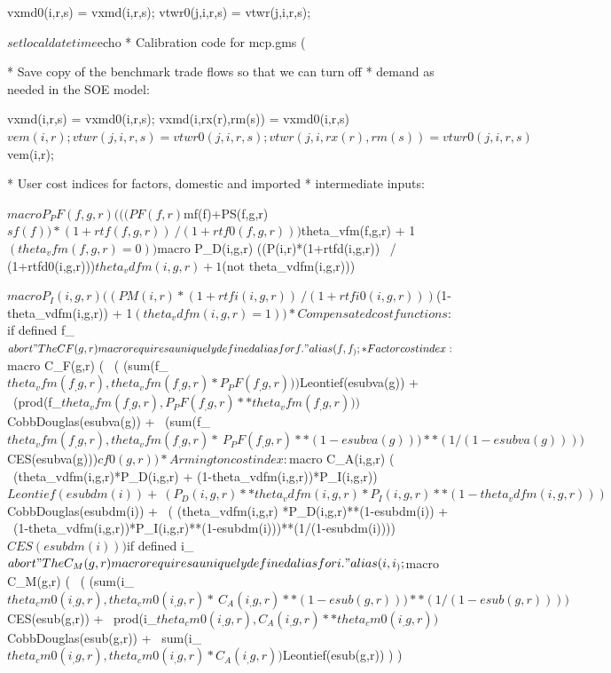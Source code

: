 \begin{GAMSCode*}
vxmd0(i,r,s) = vxmd(i,r,s);
vtwr0(j,i,r,s) = vtwr(j,i,r,s);

$setlocal datetime %
$echo   *       Calibration code for mcp.gms (%

*       Save copy of the benchmark trade flows so that we can turn off
*       demand as needed in the SOE model:

vxmd(i,r,s) = vxmd0(i,r,s);
vxmd(i,rx(r),rm(s)) = vxmd0(i,r,s)$vem(i,r);

vtwr(j,i,r,s) = vtwr0(j,i,r,s);
vtwr(j,i,rx(r),rm(s)) = vtwr0(j,i,r,s)$vem(i,r);

*       User cost indices for factors, domestic and imported
*       intermediate inputs:

$macro P_PF(f,g,r) (((PF(f,r)$mf(f)+PS(f,g,r)$sf(f))*(1+rtf(f,g,r)) \
                / (1+rtf0(f,g,r)))$theta_vfm(f,g,r)  + 1$(theta_vfm(f,g,r)=0))

$macro P_D(i,g,r)  ((P(i,r)*(1+rtfd(i,g,r)) \
                / (1+rtfd0(i,g,r)))$theta_vdfm(i,g,r) + 1$(not theta_vdfm(i,g,r)))

$macro P_I(i,g,r)  ((PM(i,r)*(1+rtfi(i,g,r)) \
                / (1+rtfi0(i,g,r)))$(1-theta_vdfm(i,g,r)) + 1$(theta_vdfm(i,g,r)=1))

*       Compensated cost functions:

$if defined f_ $abort "The CF(g,r) macro requires a uniquely defined alias for f."
alias (f,f_);

*       Factor cost index:

$macro C_F(g,r) ( \
        ( (sum(f_$theta_vfm(f_,g,r),  theta_vfm(f_,g,r)*P_PF(f_,g,r)))$Leontief(esubva(g)) + \
          (prod(f_$theta_vfm(f_,g,r), P_PF(f_,g,r)**theta_vfm(f_,g,r)))$CobbDouglas(esubva(g)) + \
          (sum(f_$theta_vfm(f_,g,r),  theta_vfm(f_,g,r)* \
                P_PF(f_,g,r)**(1-esubva(g)))**(1/(1-esubva(g))))$CES(esubva(g)))$cf0(g,r) )

*       Armington cost index:

$macro C_A(i,g,r) ( \
        (theta_vdfm(i,g,r)*P_D(i,g,r) + (1-theta_vdfm(i,g,r))*P_I(i,g,r))$Leontief(esubdm(i)) + \
        (P_D(i,g,r)**theta_vdfm(i,g,r) * P_I(i,g,r)**(1-theta_vdfm(i,g,r)))$CobbDouglas(esubdm(i)) + \
        ( (theta_vdfm(i,g,r) *P_D(i,g,r)**(1-esubdm(i)) + \
        (1-theta_vdfm(i,g,r))*P_I(i,g,r)**(1-esubdm(i)))**(1/(1-esubdm(i))))$CES(esubdm(i)))

$if defined i_ $abort "The C_M(g,r) macro requires a uniquely defined alias for i."
alias (i,i_);
$macro C_M(g,r) ( \
 ( (sum(i_$theta_cm0(i_,g,r),  theta_cm0(i_,g,r) * \
        C_A(i_,g,r)**(1-esub(g,r)))**(1/(1-esub(g,r))))$CES(esub(g,r)) + \
    prod(i_$theta_cm0(i_,g,r), C_A(i_,g,r)**theta_cm0(i_,g,r))$CobbDouglas(esub(g,r)) + \
    sum(i_$theta_cm0(i_,g,r),  theta_cm0(i_,g,r) * C_A(i_,g,r))$Leontief(esub(g,r)) ) )


\end{GAMSCode*}
